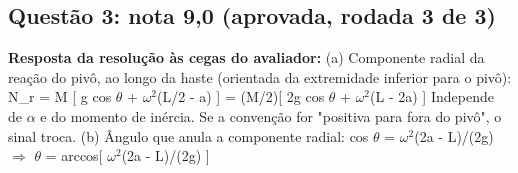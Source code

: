 \documentclass{article}%
\begin{document}
\subsection*{Questão 3: nota 9,0 (aprovada, rodada 3 de 3)}%
\textbf{Resposta da resolução às cegas do avaliador:} (a) Componente radial da reação do pivô, ao longo da haste (orientada da extremidade inferior para o pivô):\newline%
    N\_r = M {[} g cos $\theta$ + $\omega$$^2$(L/2 - a) {]} = (M/2){[} 2g cos $\theta$ + $\omega$$^2$(L - 2a) {]}\newline%
  Independe de $\alpha$ e do momento de inércia. Se a convenção for "positiva para fora do pivô", o sinal troca.\newline%
\newline%
(b) Ângulo que anula a componente radial:\newline%
    cos $\theta$ = $\omega$$^2$(2a - L)/(2g)  $\Rightarrow$  $\theta$ = arccos{[} $\omega$$^2$(2a - L)/(2g) {]}\newline%
\end{document}
